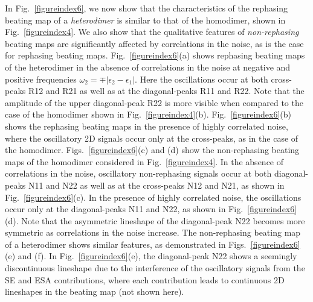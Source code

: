 \documentclass[%
 reprint,%
 amssymb, amsmath,%
 aip,cha,%
]{revtex4-1}
\newcommand{\abs}[1]{\left|#1\right|}
\begin{document}
In Fig.~\ref{figureindex6}, we now show that the characteristics of the rephasing beating map of a {\it heterodimer} is similar to that of the homodimer, shown in Fig.~\ref{figureindex4}. We also show that the qualitative features of {\it non-rephasing} beating maps are significantly affected by correlations in the noise, as is the case for rephasing beating maps. Fig.~\ref{figureindex6}(a) shows rephasing beating maps of the heterodimer in the absence of correlations in the noise at negative and positive frequencies $\omega_2=\mp\abs{\epsilon_2-\epsilon_1}$. Here the oscillations occur at both cross-peaks R12 and R21 as well as at the diagonal-peaks R11 and R22. Note that the amplitude of the upper diagonal-peak R22 is more visible when compared to the case of the homodimer shown in Fig.~\ref{figureindex4}(b). Fig.~\ref{figureindex6}(b) shows the rephasing beating maps in the presence of highly correlated noise, where the oscillatory 2D signals occur only at the cross-peaks, as in the case of the homodimer. Figs.~\ref{figureindex6}(c) and (d) show the non-rephasing beating maps of the homodimer considered in Fig.~\ref{figureindex4}. In the absence of correlations in the noise, oscillatory non-rephasing signals occur at both diagonal-peaks N11 and N22 as well as at the cross-peaks N12 and N21, as shown in Fig.~\ref{figureindex6}(c). In the presence of highly correlated noise, the oscillations occur only at the diagonal-peaks N11 and N22, as shown in Fig.~\ref{figureindex6}(d). Note that the asymmetric lineshape of the diagonal-peak N22 becomes more symmetric as correlations in the noise increase. The non-rephasing beating map of a heterodimer shows similar features, as demonstrated in Figs.~\ref{figureindex6}(e) and (f). In Fig.~\ref{figureindex6}(e), the diagonal-peak N22 shows a seemingly discontinuous lineshape due to the interference of the oscillatory signals from the SE and ESA contributions, where each contribution leads to continuous 2D lineshapes in the beating map (not shown here).
\end{document}
